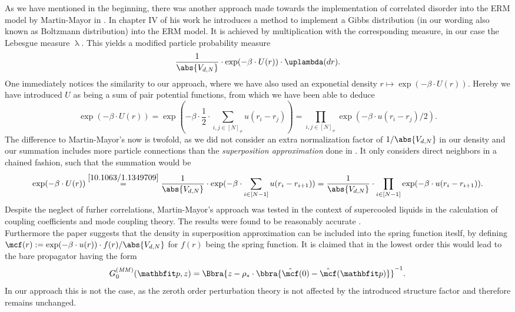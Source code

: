 As we have mentioned in the beginning, there was another approach made towards the implementation of correlated disorder into the ERM model by Martin-Mayor in \cite{10.1063/1.1349709}. In chapter IV of his work he introduces a method to implement a Gibbs distribution (in our wording also known as Boltzmann distribution) into the ERM model. It is achieved by multiplication with the corresponding measure, in our case the Lebesgue measure $\uplambda$. This yields a modified particle probability measure
\[
    \frac{1}{\abs{V_{d,N}}}\cdot\exp(-\beta\cdot U(r))\cdot\uplambda(dr).
\]
One immediately notices the similarity to our approach, where we have also used an exponetial density $r\mapsto \exp(-\beta\cdot U(r))$. Hereby we have introduced $U$ as being a sum of pair potential functions, from which we have been able to deduce
\[
    \exp(-\beta\cdot U(r)) = \exp(-\beta\cdot\frac{1}{2}\cdot\sum_{i,j\in[N]_{\neq}}u(r_i - r_j)) = \prod_{i,j\in[N]_{\neq}}\exp(-\beta\cdot u(r_i - r_j)/2).
\]
The difference to Martin-Mayor's now is twofold, as we did not consider an extra normalization factor of $1/\abs{V_{d,N}}$ in our density and our summation includes more particle connections than the \emph{superposition approximation} done in \cite{10.1063/1.1349709}. It only considers direct neighbors in a chained fashion, such that the summation would be 
\[
    \exp(-\beta\cdot U(r)) \stackrel{\cite{10.1063/1.1349709}}{=} \frac{1}{\abs{V_{d,N}}}\cdot\exp(-\beta\cdot\sum_{i\in[N-1]}u(r_i - r_{i+1})) = \frac{1}{\abs{V_{d,N}}}\cdot\prod_{i\in[N-1]}\exp(-\beta\cdot u(r_i - r_{i+1})).
\]
Despite the neglect of furher correlations, Martin-Mayor's approach was tested in the context of supercooled liquids in the calculation of coupling coefficients and mode coupling theory. The results were found to be reasonably accurate \cite{10.1063/1.1349709}. \\

Furthermore the paper suggests that the density in superposition approximation can be included into the spring function iteslf, by defining $\mcf(r) := \exp(-\beta\cdot u(r))\cdot f(r)/\abs{V_{d,N}}$ for $f(r)$ being the spring function. It is claimed that in the lowest order this would lead to the bare propagator having the form
\[
    G_0^{(\mathit{MM})}(\vp,z) = \Bbra{
        z - \rho_*\cdot\bbra{\hat\mcf(0) - \hat\mcf(\vp)}
    }^{-1}.
\]
In our approach this is not the case, as the zeroth order perturbation theory is not affected by the introduced structure factor and therefore remains unchanged. 
